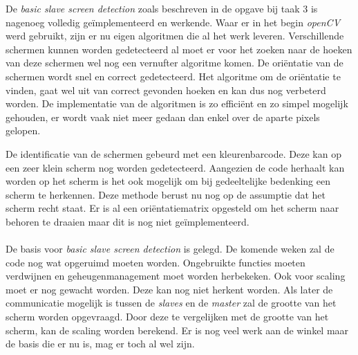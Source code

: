 De {\it basic slave screen detection} zoals beschreven in de opgave bij taak 3 is nagenoeg volledig geïmplementeerd en werkende. Waar er in het begin {\it openCV} werd gebruikt, zijn er nu eigen algoritmen die al het werk leveren. Verschillende schermen kunnen worden gedetecteerd al moet er voor het zoeken naar de hoeken van deze schermen wel nog een vernufter algoritme komen. De oriëntatie van de schermen wordt snel en correct gedetecteerd. Het algoritme om de oriëntatie te vinden, gaat wel uit van correct gevonden hoeken en kan dus nog verbeterd worden. De implementatie van de algoritmen is zo efficiënt en zo simpel mogelijk gehouden, er wordt vaak niet meer gedaan dan enkel over de aparte pixels gelopen.

De identificatie van de schermen gebeurd met een kleurenbarcode. Deze kan op een zeer klein scherm nog worden gedetecteerd. Aangezien de code herhaalt kan worden op het scherm is het ook mogelijk om bij gedeeltelijke bedenking een scherm te herkennen. Deze methode berust nu nog op de assumptie dat het scherm recht staat. Er is al een oriëntatiematrix opgesteld om het scherm naar behoren te draaien maar dit is nog niet geïmplementeerd.
\paragraph{}
De basis voor {\it basic slave screen detection} is gelegd. De komende weken zal de code nog wat opgeruimd moeten worden. Ongebruikte functies moeten verdwijnen en geheugenmanagement moet worden herbekeken. Ook voor scaling moet er nog gewacht worden. Deze kan nog niet herkent worden. Als later de communicatie mogelijk is tussen de {\it slaves} en de {\it master} zal de grootte van het scherm worden opgevraagd. Door deze te vergelijken met de grootte van het scherm, kan de scaling worden berekend. Er is nog veel werk aan de winkel maar de basis die er nu is, mag er toch al wel zijn.